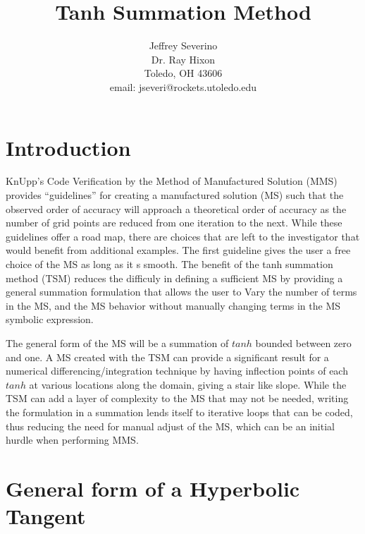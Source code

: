 \documentclass[a4paper]{article}
\begin{document}
\begin{titlepage}
    \title{Tanh Summation Method}
    \author{
        Jeffrey Severino \\
        Dr. Ray Hixon \\
        Toledo, OH 43606 \\
        email: jseveri@rockets.utoledo.edu \\
    }
\maketitle 
    
\end{titlepage}
\section{Introduction}

KnUpp's Code Verification by the Method of Manufactured Solution (MMS) provides 
``guidelines'' for creating a manufactured solution (MS) such that the observed
order of accuracy will approach a theoretical order of accuracy as the number
of grid points are reduced from one iteration to the next. While these guidelines
offer a road map, there are choices that are left to the investigator that would
benefit from additional examples. The first guideline gives the user a free
choice of the MS as long as it s smooth. The benefit of the tanh summation method 
(TSM) reduces the difficuly in defining a sufficient MS by providing 
a general summation formulation that allows the user to Vary the number of 
terms in the MS, and the MS behavior without manually changing terms in the MS
symbolic expression. 

The general form of the MS will be a summation of $tanh$ bounded between zero
and one. A MS created with the TSM can provide a significant result for
a numerical differencing/integration technique by having inflection points of each
$tanh$ at various locations along the domain, giving a stair like slope.
While the TSM can add a layer of complexity to the MS that may not be needed, 
writing the formulation in a summation lends itself to iterative loops that can 
be coded, thus reducing the need for manual adjust of the MS, 
which can be an initial hurdle when performing MMS.


\section{General form of a Hyperbolic Tangent}
\end{document}
